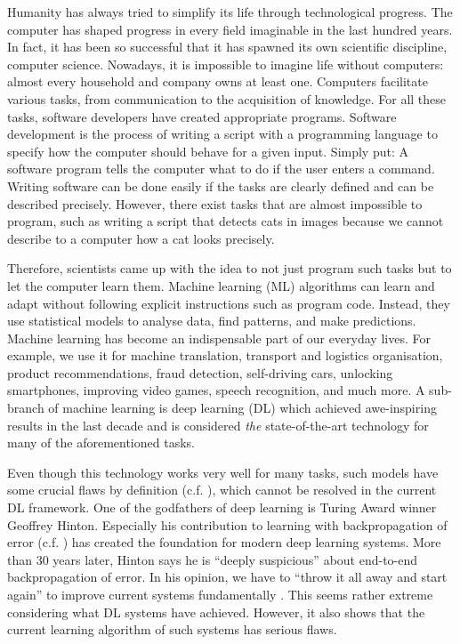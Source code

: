 Humanity has always tried to simplify its life through technological progress.
The computer has shaped progress in every field imaginable in the last hundred years. 
In fact, it has been so successful that it has spawned its own scientific discipline, computer science.
Nowadays, it is impossible to imagine life without computers: almost every household and company owns at least one.
Computers facilitate various tasks, from communication to the acquisition of knowledge.
For all these tasks, software developers have created appropriate programs.
Software development is the process of writing a script with a programming language to specify how the computer should behave for a given input.
Simply put: A software program tells the computer what to do if the user enters a command.
Writing software can be done easily if the tasks are clearly defined and can be described precisely.
However, there exist tasks that are almost impossible to program, such as writing a script that detects cats in images because we cannot describe to a computer how a cat looks precisely.

Therefore, scientists came up with the idea to not just program such tasks but to let the computer learn them.
Machine learning (ML) algorithms can learn and adapt without following explicit instructions such as program code.
Instead, they use statistical models to analyse data, find patterns, and make predictions.
Machine learning has become an indispensable part of our everyday lives.
For example, we use it for machine translation, transport and logistics organisation, product recommendations, fraud detection, self-driving cars, unlocking smartphones, improving video games, speech recognition, and much more.
A sub-branch of machine learning is deep learning (DL) which achieved awe-inspiring results in the last decade and is considered \emph{the} state-of-the-art technology for many of the aforementioned tasks.

Even though this technology works very well for many tasks, such models have some crucial flaws by definition (c.f. ), which cannot be resolved in the current DL framework.
One of the godfathers of deep learning is Turing Award winner Geoffrey Hinton. 
Especially his contribution to learning with backpropagation of error (c.f. ) has created the foundation for modern deep learning systems.
More than 30 years later, Hinton says he is ``deeply suspicious'' about end-to-end backpropagation of error. In his opinion, we have to ``throw it all away and start again'' to improve current systems fundamentally .
This seems rather extreme considering what DL systems have achieved.
However, it also shows that the current learning algorithm of such systems has serious flaws.

